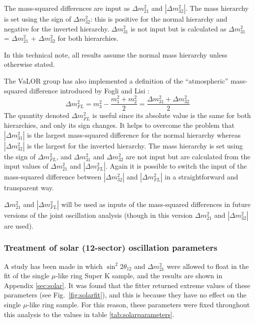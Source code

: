 The mass-squared differences are input as $\Delta m_{21}^{2}$ and $|\Delta m_{32}^{2}|$. The mass hierarchy is set using the sign of $\Delta m_{32}^{2}$: 
this is positive for the normal hierarchy and negative for the inverted hierarchy. $\Delta m_{31}^{2}$ is not input but is calculated as $\Delta m_{31}^{2}$ 
= $\Delta m_{21}^{2}$ + $\Delta m_{32}^{2}$ for both hierarchies.

In this technical note, all results assume the normal mass hierarchy unless otherwise stated. 

The VaLOR group has also implemented a definition of the ``atmospheric'' mass-squared difference introduced by Fogli and Lisi \cite{Fogli}:
\begin{equation}
\Delta m_{FL}^{2} = m_{3}^{2} - \frac {m_{1}^{2}+m_{2}^{2}} {2}  =  \frac {\Delta m_{31}^{2} + \Delta m_{32}^{2}} {2} 
\end{equation} 
The quantity denoted $\Delta m_{FL}^{2}$ is useful since its absolute value is the same for both hierarchies, and only its sign changes. It helps to overcome the 
problem that $|\Delta m_{31}^{2}|$ is the largest mass-squared difference for the normal hierarchy whereas $|\Delta m_{32}^{2}|$ is the largest for the inverted 
hierarchy. The mass hierarchy is set using the sign of $\Delta m_{FL}^{2}$, and $\Delta m_{31}^{2}$ and $\Delta m_{32}^{2}$ are not input but are calculated from 
the input values of $\Delta m_{21}^{2}$ and $|\Delta m_{FL}^{2}|$. Again it is possible to switch the input of the mass-squared difference between $|\Delta m_{32}^{2}|$ 
and $|\Delta m_{FL}^{2}|$ in a straightforward and transparent way. 

$\Delta m_{21}^{2}$ and $|\Delta m_{FL}^{2}|$ will be used as inputs of the mass-squared differences in future versions of the joint oscillation analysis (though in 
this version $\Delta m_{21}^{2}$ and $|\Delta m_{32}^{2}|$ are used).

\subsubsection{Treatment of solar (12-sector) oscillation parameters}

A study has been made in which $\sin^{2}2\theta_{12}$ and $\Delta m_{21}^{2}$ were allowed to float in the fit of the single $\mu$-like ring Super K sample, and 
the results are shown in Appendix \ref{sec:solar}. It was found that the fitter returned extreme values of these parameters (see Fig.\ \ref{fig:solarfit}), and 
this is because they have no effect on the single $\mu$-like ring sample. For this reason, these parameters were fixed throughout this analysis to the values 
in table \ref{tab:solarparameters}.

